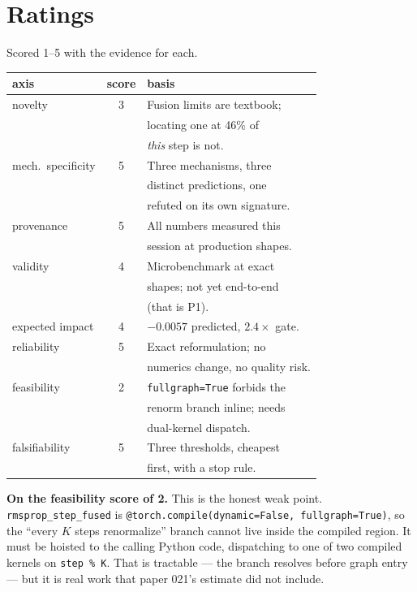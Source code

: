 \documentclass{article}
\begin{document}
\section{Ratings}
Scored 1--5 with the evidence for each.

\begin{center}\begin{small}
\begin{tabular}{lcl}
\toprule
axis & score & basis \\
\midrule
novelty & 3 & Fusion limits are textbook; \\
 & & locating one at 46\% of \\
 & & \emph{this} step is not. \\
mech.\ specificity & 5 & Three mechanisms, three \\
 & & distinct predictions, one \\
 & & refuted on its own signature. \\
provenance & 5 & All numbers measured this \\
 & & session at production shapes. \\
validity & 4 & Microbenchmark at exact \\
 & & shapes; not yet end-to-end \\
 & & (that is P1). \\
expected impact & 4 & $-0.0057$ predicted, $2.4\times$ gate. \\
reliability & 5 & Exact reformulation; no \\
 & & numerics change, no quality risk. \\
feasibility & 2 & \texttt{fullgraph=True} forbids the \\
 & & renorm branch inline; needs \\
 & & dual-kernel dispatch. \\
falsifiability & 5 & Three thresholds, cheapest \\
 & & first, with a stop rule. \\
\bottomrule
\end{tabular}
\end{small}\end{center}

\textbf{On the feasibility score of 2.} This is the honest weak point. \texttt{rmsprop\_step\_fused} is \texttt{@torch.compile(dynamic=False, fullgraph=True)}, so the ``every $K$ steps renormalize'' branch cannot live inside the compiled region. It must be hoisted to the calling Python code, dispatching to one of two compiled kernels on \texttt{step \% K}. That is tractable --- the branch resolves before graph entry --- but it is real work that paper 021's estimate did not include.
\end{document}
